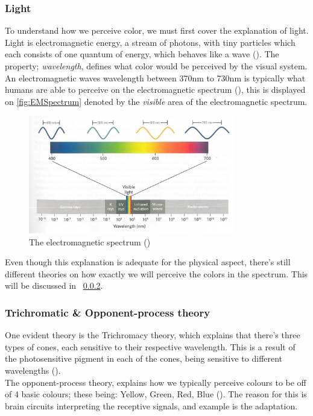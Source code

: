 \documentclass{article}
\newcommand{\secref}[1]{\nameref{#1}~\ref{#1}}
\newcommand{\goodcite}[1]{ {(\cite{#1})}}
\begin{document}
\subsubsection{Light}
To understand how we perceive color, we must first cover the explanation of light. Light is electromagnetic energy, a stream of photons, with tiny particles which each consists of one quantum of energy, which behaves like a wave\goodcite{hsp}. The property; \textit{wavelength}, defines what color would be perceived by the visual system. An electromagnetic waves wavelength between 370nm to 730nm is typically what humans are able to perceive on the electromagnetic spectrum\goodcite{hsp}, this is displayed on \autoref{fig:EMSpectrum} denoted by the \textit{visible} area of the electromagnetic spectrum.
\begin{figure}[H]
  \centering
  \includegraphics[width=0.8\textwidth]{img/EMSpectrum.jpg}
  \caption{The electromagnetic spectrum\goodcite{hsp}}
  \label{fig:EMSpectrum}
\end{figure}
Even though this explanation is adequate for the physical aspect, there's still different theories on how exactly we will perceive the colors in the spectrum. This will be discussed in \secref{sec:color-trichro-n-dichro}.\\

\subsubsection{Trichromatic \& Opponent-process theory} %
\label{sec:color-trichro-n-dichro}
One evident theory is the Trichromacy theory, which explains that there's three types of cones, each sensitive to their respective wavelength. This is a result of the photosensitive pigment in each of the cones, being sensitive to different wavelengths\goodcite{hsp}.\medskip \\

The opponent-process theory, explains how we typically perceive colours to be off of 4 basic colours; these being: Yellow, Green, Red, Blue\goodcite{hsp}. The reason for this is brain circuits interpreting the receptive signals, and example is the adaptation.
\end{document}
